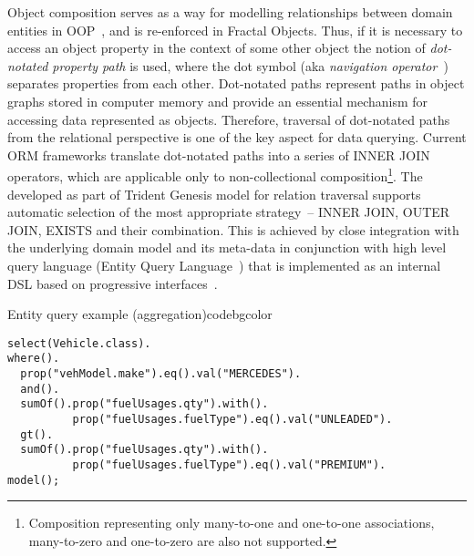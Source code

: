   Object composition serves as a way for modelling relationships between domain entities in OOP~\cite{Martin2002}, and is re-enforced in Fractal Objects.
  Thus, if it is necessary to access an object property in the context of some other object the notion of \emph{dot-notated property path} is used, where the dot symbol (aka \emph{navigation operator}~\cite{DeMichiel:2012:JPA}) separates properties from each other.
  Dot-notated paths represent paths in object graphs stored in computer memory and provide an essential mechanism for accessing data represented as objects.
  Therefore, traversal of dot-notated paths from the relational perspective is one of the key aspect for data querying.
  Current ORM frameworks translate dot-notated paths into a series of INNER JOIN operators, which are applicable only to non-collectional composition\footnote{Composition representing only many-to-one and one-to-one associations, many-to-zero and one-to-zero are also not supported.}.
  The developed as part of Trident Genesis model for relation traversal supports automatic selection of the most appropriate strategy~-- INNER JOIN, OUTER JOIN, EXISTS and their combination.
  This is achieved by close integration with the underlying domain model and its meta-data in conjunction with high level query language (Entity Query Language~\cite{Hodych:2012}) that is implemented as an internal DSL based on progressive interfaces~\cite{Fowler:2010:DSL}.


  \begin{code}{Entity query example (aggregation)}{\label{ch01:00:lst:eql-aggregation}}{codebgcolor}
    \begin{lstlisting}
select(Vehicle.class).
where().
  prop("vehModel.make").eq().val("MERCEDES").
  and().
  sumOf().prop("fuelUsages.qty").with().
          prop("fuelUsages.fuelType").eq().val("UNLEADED").
  gt().
  sumOf().prop("fuelUsages.qty").with().
          prop("fuelUsages.fuelType").eq().val("PREMIUM").
model();
    \end{lstlisting}
   \end{code}
  
